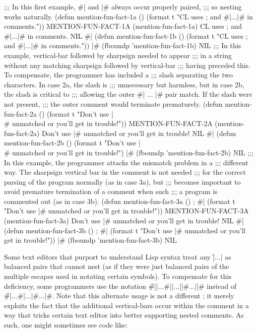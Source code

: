 ;;; In this first example, #| and |# always occur properly paired,
;;; so nesting works naturally.
 (defun mention-fun-fact-1a ()
   (format t "CL uses ; and #|...|# in comments."))
\EV MENTION-FUN-FACT-1A
 (mention-fun-fact-1a)
\OUT CL uses ; and #|...|# in comments.
\EV NIL
 #| (defun mention-fun-fact-1b ()
      (format t "CL uses ; and #|...|# in comments.")) |#
 (fboundp 'mention-fun-fact-1b) \EV NIL
\goodbreak
;;; In this example, vertical-bar followed by sharpsign needed to appear
;;; in a string without any matching sharpsign followed by vertical-bar
;;; having preceded this.  To compensate, the programmer has included a
;;; slash separating the two characters.  In case 2a, the slash is 
;;; unnecessary but harmless, but in case 2b, the slash is critical to
;;; allowing the outer #| ... |# pair match.  If the slash were not present,
;;; the outer comment would terminate prematurely.
 (defun mention-fun-fact-2a ()
   (format t "Don't use |\\# unmatched or you'll get in trouble!"))
\EV MENTION-FUN-FACT-2A
 (mention-fun-fact-2a)
\OUT Don't use |# unmatched or you'll get in trouble!
\EV NIL
 #| (defun mention-fun-fact-2b ()
      (format t "Don't use |\\# unmatched or you'll get in trouble!") |#
 (fboundp 'mention-fun-fact-2b) \EV NIL
\goodbreak
;;; In this example, the programmer attacks the mismatch problem in a
;;; different way.  The sharpsign vertical bar in the comment is not needed
;;; for the correct parsing of the program normally (as in case 3a), but 
;;; becomes important to avoid premature termination of a comment when such 
;;; a program is commented out (as in case 3b).
 (defun mention-fun-fact-3a () ; #|
   (format t "Don't use |# unmatched or you'll get in trouble!"))
\EV MENTION-FUN-FACT-3A
 (mention-fun-fact-3a)
\OUT Don't use |# unmatched or you'll get in trouble!
\EV NIL
 #|
 (defun mention-fun-fact-3b () ; #|
   (format t "Don't use |# unmatched or you'll get in trouble!"))
 |#
 (fboundp 'mention-fun-fact-3b) \EV NIL
\endcode

\endsubsubsubsection%


Some text editors that purport to understand Lisp syntax treat any \f{|...|}
as balanced pairs that cannot nest (as if they were just balanced pairs of 
the multiple escapes used in notating certain symbols).  To compensate for 
this deficiency, some programmers use the notation \f{\#||...\#||...||\#...||\#}
instead of \f{\#|...\#|...|\#...|\#}.   Note that this alternate usage is not
a different ; it merely exploits the fact that the additional
vertical-bars occur within the comment in a way that tricks certain text editor
into better supporting nested comments.  As such, one might sometimes see code
like:

